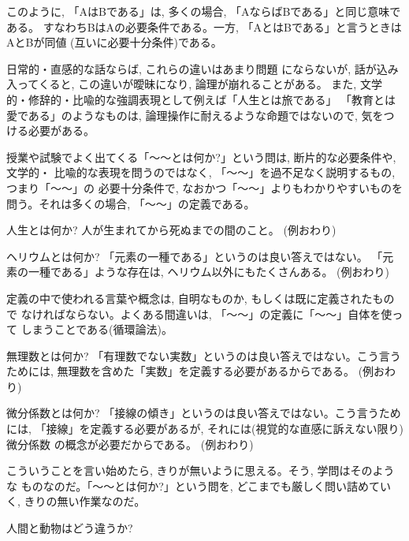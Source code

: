 このように, 「AはBである」は, 多くの場合, 「AならばBである」と同じ意味である。
すなわちBはAの必要条件である。一方, 「AとはBである」と言うときはAとBが同値
(互いに必要十分条件)である。

日常的・直感的な話ならば, これらの違いはあまり問題
にならないが, 話が込み入ってくると, この違いが曖昧になり, 論理が崩れることがある。
また, 文学的・修辞的・比喩的な強調表現として例えば「人生とは旅である」
「教育とは愛である」のようなものは, 論理操作に耐えるような命題ではないので, 
気をつける必要がある。

授業や試験でよく出てくる「〜〜とは何か?」という問は, 断片的な必要条件や, 文学的・
比喩的な表現を問うのではなく, 「〜〜」を過不足なく説明するもの, つまり「〜〜」の
必要十分条件で, なおかつ「〜〜」よりもわかりやすいものを問う。それは多くの場合, 
「〜〜」の定義である。\\

\begin{exmpl}
人生とは何か? 人が生まれてから死ぬまでの間のこと。
(例おわり)\end{exmpl}

\begin{exmpl}
ヘリウムとは何か? 「元素の一種である」というのは良い答えではない。
「元素の一種である」ような存在は, ヘリウム以外にもたくさんある。
(例おわり)\end{exmpl}
\mv

定義の中で使われる言葉や概念は, 自明なものか, もしくは既に定義されたもので
なければならない。よくある間違いは, 「〜〜」の定義に「〜〜」自体を使って
しまうことである(循環論法)。\\

\begin{exmpl}
無理数とは何か? 「有理数でない実数」というのは良い答えではない。こう言うためには, 
無理数を含めた「実数」を定義する必要があるからである。
(例おわり)\end{exmpl}

\begin{exmpl}
微分係数とは何か? 「接線の傾き」というのは良い答えではない。こう言うためには, 
「接線」を定義する必要があるが, それには(視覚的な直感に訴えない限り)微分係数
の概念が必要だからである。
(例おわり)\end{exmpl}
\mv

こういうことを言い始めたら, きりが無いように思える。そう, 学問はそのような
ものなのだ。「〜〜とは何か?」という問を, どこまでも厳しく問い詰めていく, 
きりの無い作業なのだ。\\

\begin{q}\label{q:logic_human_animal}
人間と動物はどう違うか?
\end{q}
\vv

